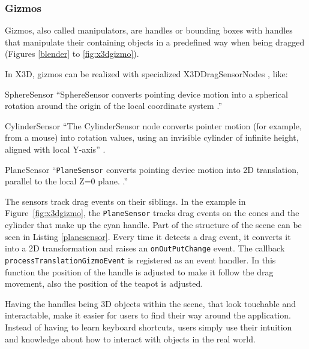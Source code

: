 \subsubsection{Gizmos}\label{gizmos}

Gizmos, also called manipulators, are handles or bounding boxes with
handles that manipulate their containing objects in a predefined way when
being dragged (Figures \ref{blender} to \ref{fig:x3dgizmo}). \cite{wikigizmo}

In \gls{X3D}, gizmos can be realized with specialized X3DDragSensorNodes \cite{x3ddragsensornode}, like:

\begin{description*}
\item[SphereSensor]
  ``SphereSensor converts pointing device motion into a spherical rotation around the origin of the local coordinate system \cite{spheresensor}.''
\item[CylinderSensor]
  ``The CylinderSensor node converts pointer motion (for example, from a mouse) into rotation values, using an invisible cylinder of infinite height, aligned with local Y-axis'' \cite{cylindersensor}.
\item[PlaneSensor]
  ``\texttt{PlaneSensor} converts pointing device motion into 2D translation, parallel to the local Z=0 plane. \cite{planesensor}.''
\end{description*}

The sensors track drag events on their siblings. In the example in
Figure~\ref{fig:x3dgizmo}, the
\texttt{PlaneSensor} tracks drag events on the cones and the cylinder that make up the
cyan handle. Part of the structure of the scene can be seen in Listing
\ref{planesensor}.
Every time it detects a drag event, it converts it into a 2D
transformation and raises an \texttt{onOutPutChange} event.
The callback \texttt{processTranslationGizmoEvent} is registered as an event handler.
In this function the position of the handle is adjusted to make it
follow the drag movement, also the position of the teapot is adjusted.

Having the handles being \gls{3D} objects within the scene, that look
touchable and interactable, make it easier for users to find their way
around the application. Instead of having to learn keyboard shortcuts,
users simply use their intuition and knowledge about how to interact with
objects in the real world.

